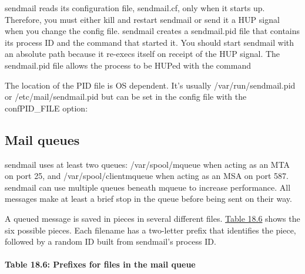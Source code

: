 {sendmail} reads its configuration file,
\protect\hypertarget{part0026_split_026.htmlux5cux23_idIndexMarker2503}{}{}{sendmail.cf},
only when it starts up. Therefore, you must either kill and restart
{sendmail} or send it a HUP signal when you change the config file.
{sendmail} creates a {sendmail.pid} file that contains its process ID
and the command that started it. You should start {sendmail} with an
absolute path because it re-{exec}s itself on receipt of the HUP signal.
The {sendmail.pid} file allows the process to be HUPed with the command


The location of the PID file is OS dependent. It's usually
{/var/run/sendmail.pid} or {/etc/mail/sendmail.pid} but can be set in
the config file with the {confPID\_FILE} option:


\protect\hypertarget{part0026_split_027.html}{}{}

\hypertarget{part0026_split_027.htmlux5cux23_idContainer1247}{}
\hypertarget{part0026_split_027.htmlux5cux23calibre_pb_26}{%
\subsection[Mail
queues]{\texorpdfstring{\protect\hypertarget{part0026_split_027.htmlux5cux23_idTextAnchor1050}{}{}Mail
queues}{Mail queues}}\label{part0026_split_027.htmlux5cux23calibre_pb_26}}

\protect\hypertarget{part0026_split_027.htmlux5cux23_idIndexMarker2504}{}{}{sendmail}
uses at least two queues:
\protect\hypertarget{part0026_split_027.htmlux5cux23_idIndexMarker2505}{}{}{/var/spool/mqueue}
when acting as an MTA on port 25, and
\protect\hypertarget{part0026_split_027.htmlux5cux23_idIndexMarker2506}{}{}{/var/spool/clientmqueue}
when acting as an MSA on port 587. {sendmail} can use multiple queues
beneath {mqueue} to increase performance. All messages make at least a
brief stop in the queue before being sent on their way.

A queued message is saved in pieces in several different files.
\protect\hyperlink{part0026_split_027.htmlux5cux23_idTextAnchor1051}{Table
18.6} shows the six possible pieces. Each filename has a two-letter
prefix that identifies the piece, followed by a random ID built from
{sendmail}'s process ID.

\paragraph[{Table 18.6: }Prefixes for files in the mail
queue]{\texorpdfstring{{Table 18.6:
}\protect\hypertarget{part0026_split_027.htmlux5cux23_idTextAnchor1051}{}{}\protect\hypertarget{part0026_split_027.htmlux5cux23_idTextAnchor1052}{}{}Prefixes
for files in the mail
queue}{Table 18.6: Prefixes for files in the mail queue}}

